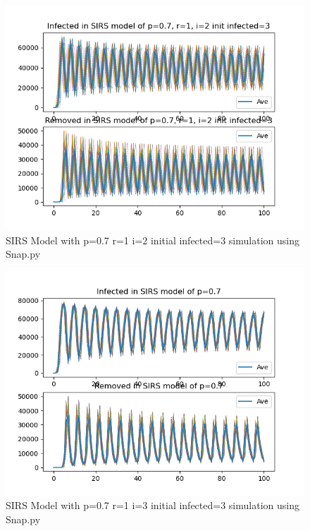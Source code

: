 \documentclass{subfile}
\begin{document}
  \begin{figure}
  \includegraphics[scale=0.8]{sirsp07r1i2s3}
  \caption[SIRS p=0.7,r=1,i=2,init infected=3]{SIRS Model with p=0.7 r=1 i=2 initial infected=3 simulation using Snap.py}
  \end{figure}
  \begin{figure}
  \includegraphics[scale=0.8]{sirsp07r1i3s3}
  \caption[SIRS p=0.7,r=1,i=3,init infected=3]{SIRS Model with p=0.7 r=1 i=3 initial infected=3 simulation using Snap.py}
  \end{figure}
\end{document}
